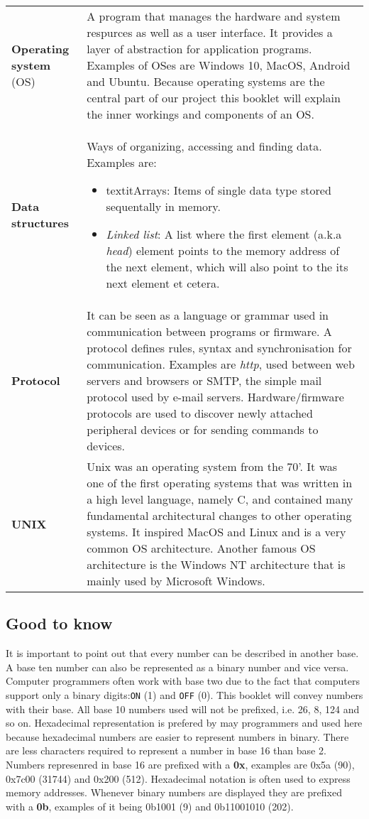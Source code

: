 \begin{tabular}{ | m{20mm} | m{60mm} |}
\textbf{Operating system} (OS) & A program that manages the hardware and system respurces as well as a user interface. It provides a layer of abstraction for application programs. Examples of OSes are Windows 10, MacOS, Android and Ubuntu. Because operating systems are the central part of our project this booklet will explain the inner workings and components of an OS. \\
\textbf{Data structures} & Ways of organizing, accessing and finding data. Examples are: \begin{itemize}
\item textit{Arrays}: Items of single data type stored sequentally in memory.
\item \textit{Linked list}: A list where the first element (a.k.a \textit{head}) element points to the memory address of the next element, which will also point to the its next element et cetera.
\end{itemize} \\
\textbf{Protocol} & It can be seen as a language or grammar used in communication between programs or firmware. A protocol defines rules, syntax and synchronisation for communication. Examples are \textit{http}, used between web servers and browsers or SMTP, the simple mail protocol used by e-mail servers. Hardware/firmware protocols are used to discover newly attached peripheral devices or for sending commands to devices. \\
\textbf{UNIX} & Unix was an operating system from the 70'. It was one of the first operating systems that was written in a high level language, namely C, and contained many fundamental architectural changes to other operating systems. It inspired MacOS and Linux and is a very common OS architecture. Another famous OS architecture is the Windows NT architecture that is mainly used by Microsoft Windows.
\end{tabular}


\subsection{Good to know}

It is important to point out that every number can be described in another base. A base ten number can also be represented
as a binary number and vice versa. Computer programmers often work with base two due to the fact that computers support only a
binary digits:\texttt{ON} (1) and \texttt{OFF} (0).
This booklet will convey numbers with their base. All base 10 numbers used will not be prefixed, i.e. 26, 8, 124 and so on.
Hexadecimal representation is prefered by may programmers and used here because hexadecimal numbers are easier to represent
numbers in binary. There are less characters required to represent a number in base 16 than base 2. Numbers represenred in
base 16 are prefixed with a \textbf{0x}, examples are 0x5a (90), 0x7c00 (31744) and 0x200 (512). Hexadecimal notation is often used to
express memory addresses. Whenever binary numbers are displayed they are prefixed with a \textbf{0b}, examples of it being 0b1001 (9)
and 0b11001010 (202).

